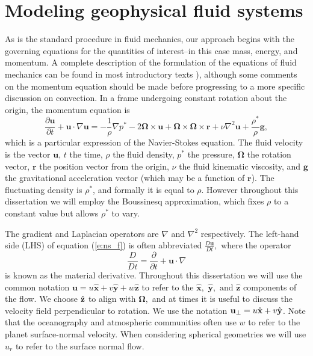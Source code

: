 \section{Modeling geophysical fluid systems}
\label{s:gafd}

As is the standard procedure in fluid mechanics, our approach begins with the governing equations for the quantities of interest--in this case mass, energy, and momentum. A complete description of the formulation of the equations of fluid mechanics can be found in most introductory texts \citep[e.g.][]{dT01,gV06}), although some comments on the momentum equation should be made before progressing to a more specific discussion on convection.
In a frame undergoing constant rotation about the origin, the momentum equation is
\begin{equation}
	\frac{\partial \mathbf{u}}{\partial t} + \mathbf{u}\cdot \nabla \mathbf{u} = -\frac{1}{\rho}\nabla p^{*}- 2 \mathbf{\Omega}\times\mathbf{u}+ \mathbf{\Omega}\times\mathbf{\Omega}\times \mathbf{r} + \nu\nabla^{2}\mathbf{u}+ \frac{\rho^{*}}{\rho}\mathbf{g},
	\label{e:ns_f}
\end{equation}
which is a particular expression of the Navier-Stokes equation.
The fluid velocity is the vector $\mathbf{u}$, $t$ the time,  $\rho$ the fluid density, $p^{*}$ the pressure, $\mathbf\Omega$ the rotation vector,  $\mathbf{r}$ the position vector from the origin, $\nu$ the fluid kinematic viscosity, and $\mathbf{g}$ the gravitational acceleration vector (which may be a function of $\mathbf{r}$). The fluctuating density is $\rho^{*}$, and formally it is equal to $\rho.$ However throughout this dissertation we will employ the Boussinesq approximation, which fixes $\rho $ to a constant value but allows $\rho^{*}$ to vary. 

The gradient and Laplacian operators are $\nabla$ and $\nabla^{2}$ respectively. The left-hand side (LHS) of equation (\ref{e:ns_f}) is often abbreviated
$\frac{D\mathbf{u}}{Dt},$ 
where the operator 
\begin{equation}
\frac{D}{Dt} = \frac{\partial }{\partial t} + \mathbf{u} \cdot \nabla
	\label{e:mat_d}
\end{equation}
is known as the material derivative.
Throughout this dissertation we will use the common notation $\mathbf{u} = u \hat{\mathbf{x}} + v \hat{\mathbf{y}} + w \hat{\mathbf{z}}$ to refer to the $\hat{\mathbf{x}},$ $\hat{\mathbf{y}},\text{ and }\hat{\mathbf{z}}$ components of the flow. 
We choose ${ {\hat{\mathbf{z}}} }$ to align with $\mathbf{\Omega},$ and at times it is useful to discuss the velocity field perpendicular to rotation.
We use the notation $\mathbf{u}_{\perp}= u { {\hat{\mathbf{x}}} } + v { {\hat{\mathbf{y}}} }$. 
Note that the oceanography and atmospheric communities often use $w$ to refer to the planet surface-normal velocity. When considering spherical geometries we will use $u_{r}$ to refer to the surface normal flow.

